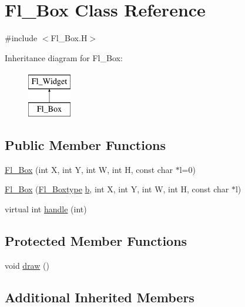 \hypertarget{class_fl___box}{}\section{Fl\+\_\+\+Box Class Reference}
\label{class_fl___box}


{\ttfamily \#include $<$Fl\+\_\+\+Box.\+H$>$}

Inheritance diagram for Fl\+\_\+\+Box\+:\begin{figure}[H]
\begin{center}
\leavevmode
\includegraphics[height=2.000000cm]{class_fl___box}
\end{center}
\end{figure}
\subsection*{Public Member Functions}
\begin{DoxyCompactItemize}
\item 
\hyperlink{class_fl___box_aefe388870c477330fb646b450fd5225c}{Fl\+\_\+\+Box} (int X, int Y, int W, int H, const char $\ast$l=0)
\item 
\hyperlink{class_fl___box_aadca87f8bab6bdd53090e52300069dfa}{Fl\+\_\+\+Box} (\hyperlink{_enumerations_8_h_ae48bf9070f8541de17829f54ccacc6bc}{Fl\+\_\+\+Boxtype} \hyperlink{forms_8_h_a0ba06a290a384fa06b1b90745827dae2}{b}, int X, int Y, int W, int H, const char $\ast$l)
\item 
virtual int \hyperlink{class_fl___box_a1e6e8c64afb58d433429500f5d1b25c7}{handle} (int)
\end{DoxyCompactItemize}
\subsection*{Protected Member Functions}
\begin{DoxyCompactItemize}
\item 
void \hyperlink{class_fl___box_a68ad5028e9911fa875d79f686f80b3e8}{draw} ()
\end{DoxyCompactItemize}
\subsection*{Additional Inherited Members}


